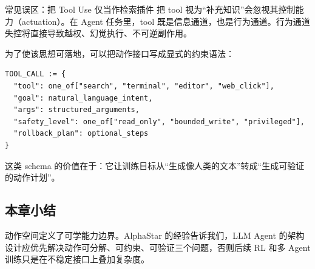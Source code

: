 \begin{warningbox}{常见误区：把 Tool Use 仅当作检索插件}
把 tool 视为``补充知识''会忽视其控制能力（actuation）。在 Agent 任务里，tool 既是信息通道，也是行为通道。行为通道失控将直接导致越权、幻觉执行、不可逆副作用。
\end{warningbox}

为了使该思想可落地，可以把动作接口写成显式的约束语法：
\begin{lstlisting}[caption={一个最小化的 Tool API Schema（示意）}]
TOOL_CALL := {
  "tool": one_of["search", "terminal", "editor", "web_click"],
  "goal": natural_language_intent,
  "args": structured_arguments,
  "safety_level": one_of["read_only", "bounded_write", "privileged"],
  "rollback_plan": optional_steps
}
\end{lstlisting}
这类 schema 的价值在于：它让训练目标从``生成像人类的文本''转成``生成可验证的动作计划''。

\subsection{本章小结}
动作空间定义了可学能力边界。AlphaStar 的经验告诉我们，LLM Agent 的架构设计应优先解决动作可分解、可约束、可验证三个问题，否则后续 RL 和多 Agent 训练只是在不稳定接口上叠加复杂度。

